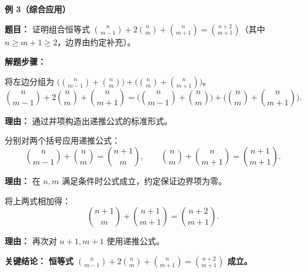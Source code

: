 \begin{examplebox}
	\medskip
	\textbf{\textcolor{CExample}{例 3（综合应用）}}

	\textbf{\textcolor{CExample}{题目：}}
	证明组合恒等式 $\binom{n}{m-1}+2\binom{n}{m}+\binom{n}{m+1}=\binom{n+2}{m+1}$（其中 $n\geq m+1\geq 2$，边界由约定补充）。

	\textbf{\textcolor{CExample}{解题步骤：}}
	\begin{description}[style=nextline, leftmargin=2.8em, labelsep=0.5em, itemsep=0.45em]
		\item[\textbf{第一步（分组变形）：}] 将左边分组为 $\bigl(\binom{n}{m-1}+\binom{n}{m}\bigr) + \bigl(\binom{n}{m}+\binom{n}{m+1}\bigr)$。
			\[
				\binom{n}{m-1}+2\binom{n}{m}+\binom{n}{m+1}
				= \bigl(\binom{n}{m-1}+\binom{n}{m}\bigr) + \bigl(\binom{n}{m}+\binom{n}{m+1}\bigr).
			\]
			\par\textbf{理由：} 通过并项构造出递推公式的标准形式。
		\item[\textbf{第二步（应用递推）：}] 分别对两个括号应用递推公式：
			\[
				\binom{n}{m-1}+\binom{n}{m} = \binom{n+1}{m},
				\qquad
				\binom{n}{m}+\binom{n}{m+1} = \binom{n+1}{m+1}.
			\]
			\par\textbf{理由：} 在 $n,m$ 满足条件时公式成立，约定保证边界项为零。
		\item[\textbf{第三步（再次递推）：}] 将上两式相加得：
			\[
				\binom{n+1}{m} + \binom{n+1}{m+1} = \binom{n+2}{m+1}.
			\]
			\par\textbf{理由：} 再次对 $n+1,m+1$ 使用递推公式。
	\end{description}
	\textbf{\textcolor{CExample}{关键结论：}}
	\textbf{恒等式 $\binom{n}{m-1}+2\binom{n}{m}+\binom{n}{m+1}=\binom{n+2}{m+1}$ 成立。}
\end{examplebox}
